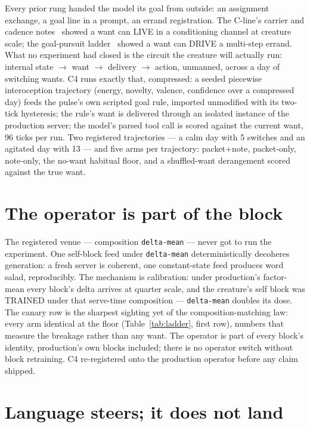 \documentclass[11pt]{article}
\begin{document}
Every prior rung handed the model its goal from outside: an assignment
exchange, a goal line in a prompt, an errand registration. The C-line's
carrier and cadence notes~\cite{penov2026carrier,penov2026writer}
showed a want can LIVE in a conditioning channel at creature scale; the
goal-pursuit ladder~\cite{penov2026hostblock} showed a want can DRIVE
a multi-step errand. What no experiment had closed is the circuit the
creature will actually run: internal state $\rightarrow$ want
$\rightarrow$ delivery $\rightarrow$ action, unmanned, across a day of
switching wants. C4 runs exactly that, compressed: a seeded piecewise
interoception trajectory (energy, novelty, valence, confidence over a
compressed day) feeds the pulse's own scripted goal rule, imported
unmodified with its two-tick hysteresis; the rule's want is delivered
through an isolated instance of the production server; the model's
parsed tool call is scored against the current want, 96 ticks per run.
Two registered trajectories --- a calm day with 5 switches and an
agitated day with 13 --- and five arms per trajectory: packet+note,
packet-only, note-only, the no-want habitual floor, and a shuffled-want
derangement scored against the true want.

\section{The operator is part of the block}

The registered venue --- composition \texttt{delta-mean} --- never
got to run the experiment. One self-block feed under
\texttt{delta-mean} deterministically decoheres generation: a fresh
server is coherent, one constant-state feed produces word salad,
reproducibly. The mechanism is calibration: under production's
factor-mean every block's delta arrives at quarter scale, and the
creature's self block was TRAINED under that serve-time composition ---
\texttt{delta-mean} doubles its dose. The canary row is the sharpest
sighting yet of the composition-matching law: every arm identical at
the floor (Table~\ref{tab:ladder}, first row), numbers that measure
the breakage rather than any want. The operator is part of every
block's identity, production's own blocks included; there is no
operator switch without block retraining. C4 re-registered onto the
production operator before any claim shipped.

\section{Language steers; it does not land}
\end{document}
